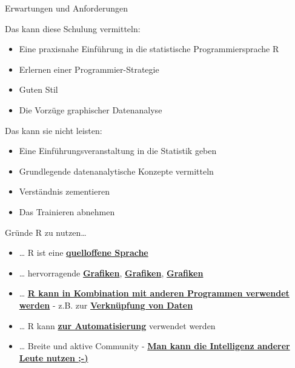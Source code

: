 \documentclass[
  ignorenonframetext,
]{beamer}
\providecommand{\tightlist}{%
  \setlength{\itemsep}{0pt}\setlength{\parskip}{0pt}}
\begin{document}
\begin{frame}{Erwartungen und Anforderungen}
\protect\hypertarget{erwartungen-und-anforderungen}{}

\begin{block}{Das kann diese Schulung vermitteln:}

\begin{itemize}
\tightlist
\item
  Eine praxisnahe Einführung in die statistische Programmiersprache R
\item
  Erlernen einer Programmier-Strategie
\item
  Guten Stil
\item
  Die Vorzüge graphischer Datenanalyse
\end{itemize}

\end{block}

\begin{block}{Das kann sie nicht leisten:}

\begin{itemize}
\tightlist
\item
  Eine Einführungsveranstaltung in die Statistik geben
\item
  Grundlegende datenanalytische Konzepte vermitteln
\item
  Verständnis zementieren
\item
  Das Trainieren abnehmen
\end{itemize}

\end{block}

\end{frame}

\begin{frame}{Gründe R zu nutzen\ldots{}}
\protect\hypertarget{grunde-r-zu-nutzen}{}

\begin{itemize}
\item
  \ldots{} R ist eine
  \href{https://stackoverflow.com/questions/1546583/what-is-the-definition-of-an-open-source-programming-language}{\textbf{quelloffene
  Sprache}}
\item
  \ldots{} hervorragende
  \href{http://matthewlincoln.net/2014/12/20/adjacency-matrix-plots-with-r-and-ggplot2.html}{\textbf{Grafiken}},
  \href{https://www.r-bloggers.com/3d-plots-with-ggplot2-and-plotly\%20/}{\textbf{Grafiken}},
  \href{https://procomun.wordpress.com/2011/03/18/splomr/}{\textbf{Grafiken}}
\item
  \ldots{} \href{https://github.com/Japhilko/RInterfaces}{\textbf{R kann
  in Kombination mit anderen Programmen verwendet werden}} - z.B. zur
  \href{https://github.com/Japhilko/RInterfaces/blob/master/slides/Datenimport.md}{\textbf{Verknüpfung
  von Daten}}
\item
  \ldots{} R kann
  \href{https://cran.r-project.org/web/packages/MplusAutomation/index.html}{\textbf{zur
  Automatisierung}} verwendet werden
\item
  \ldots{} Breite und aktive Community -
  \href{https://www.r-bloggers.com/}{\textbf{Man kann die Intelligenz
  anderer Leute nutzen ;-)}}
\end{itemize}

\end{frame}
\end{document}
